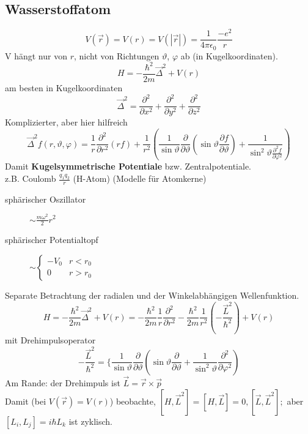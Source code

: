 \documentclass[oneside]{book}
\theoremstyle{definition}
\newcommand{\fpartial}[1]{\frac{\partial}{\partial #1}}
\newcommand{\ffpartial}[2]{\frac{\partial #1}{\partial #2}}
\newcommand{\vp}{\varphi}
\begin{document}
\subsection{Wasserstoffatom}
$$V(\vec{r}) = V(r) = V(|\vec{r}|) = \frac{1}{4\pi \epsilon_0} \frac{-e^2}{r}$$
V hängt nur von $r$, nicht von Richtungen $\vartheta$, $\vp$ ab (in Kugelkoordinaten).
$$H = - \frac{\hbar^2}{2m} \vec{\Delta}^2 + V(r)$$
am besten in Kugelkoordinaten
$$\vec{\Delta}^2 = \ffpartial{^2}{x^2} + \ffpartial{^2}{y^2} + \ffpartial{^2}{z^2}$$
Komplizierter, aber hier hilfreich
$$\vec{\Delta}^2 f(r, \vartheta, \vp) = \frac{1}{r} \ffpartial{^2}{r^2} (rf) + \frac{1}{r^2} (\frac{1}{\sin \vartheta} \fpartial{\vartheta} (\sin \vartheta \ffpartial{f}{\vartheta}) + \frac{1}{\sin^2 \vartheta \ffpartial{^2 f}{\vp^2}})$$
Damit \textbf{Kugelsymmetrische Potentiale} bzw. Zentralpotentiale.\\
z.B. Coulomb $\frac{q_1 q_2}{r}$ (H-Atom)
(Modelle für Atomkerne)\\
\begin{description}
	\item[sphärischer Oszillator] $\sim \frac{m \omega^2}{2} r^2$
	\item[sphärischer Potentialtopf] $\sim \begin{cases}
	- V_0 & r < r_0\\
	0 & r > r_0
	\end{cases}$
\end{description}
Separate Betrachtung der radialen und der Winkelabhängigen Wellenfunktion.
$$H = - \frac{\hbar^2}{2m} \vec{\Delta}^2 + V(r) = - \frac{\hbar^2}{2m} \frac{1}{r} \ffpartial{^2}{r^2} - \frac{\hbar^2}{2m} \frac{1}{r^2} (- \frac{\vec{L}^2}{\hbar^2}) + V(r)$$
mit Drehimpulsoperator
$$- \frac{\vec{L}^2}{\hbar^2} = \{\frac{1}{\sin \vartheta} \fpartial{\vartheta} (\sin \vartheta \fpartial{\vartheta} + \frac{1}{\sin^2 \vartheta} \ffpartial{^2}{\vp^2})$$
Am Rande: der Drehimpuls ist $\vec{L} = \vec{r} \times \vec{p}$\\
Damit (bei $V(\vec{r}) = V(r)$) beobachte, $[H, \vec{L}^2] = [H, \vec{L}] = 0, [\vec{L}, \vec{L}^2];$ aber $[L_i, L_j] = i \hbar L_k$ ist zyklisch.
\end{document}
